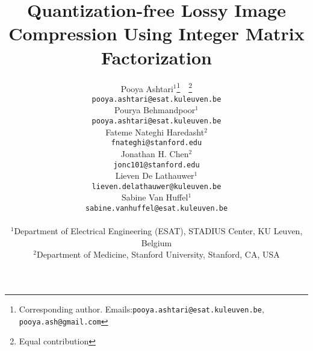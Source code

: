 \documentclass{article}
\title{Quantization-free Lossy Image Compression Using Integer Matrix Factorization}
\author{%
Pooya Ashtari$^{1}$\thanks{Corresponding author. Emails:\texttt{pooya.ashtari@esat.kuleuven.be}, \texttt{pooya.ash@gmail.com}}\ \ \thanks{Equal contribution} \\
\texttt{pooya.ashtari@esat.kuleuven.be} \\
\And
Pourya Behmandpoor$^{1}$\footnotemark[2] \\
\texttt{pooya.ashtari@esat.kuleuven.be} \\
\And
Fateme Nateghi Haredasht$^{2}$ \\
\texttt{fnateghi@stanford.edu} \\
\And
Jonathan H. Chen$^{2}$ \\
\texttt{jonc101@stanford.edu} \\
\And
Lieven De Lathauwer$^{1}$ \\
\texttt{lieven.delathauwer@kuleuven.be} \\
\And
Sabine Van Huffel$^{1}$ \\
\texttt{sabine.vanhuffel@esat.kuleuven.be} \\
\And
\vspace{-15pt} \\
$^{1}$Department of Electrical Engineering (ESAT), STADIUS Center, KU Leuven, Belgium \\
$^{2}$Department of Medicine, Stanford University, Stanford, CA, USA \\
}
\begin{document}
\maketitle

















\medskip

{
\small


}



\appendix




\end{document}
